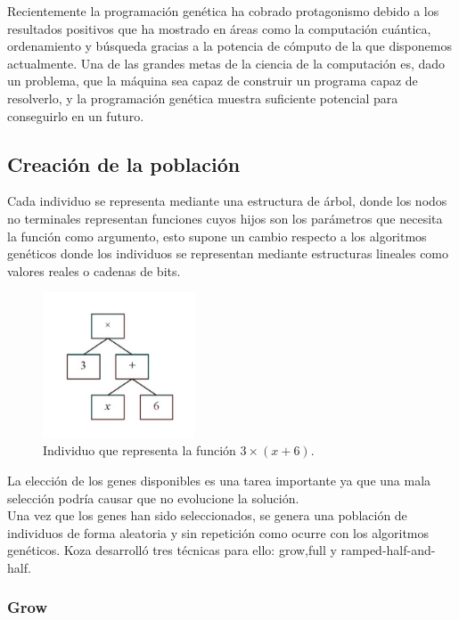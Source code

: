 \documentclass[12pt]{article} \usepackage[utf8]{inputenc}
\begin{document}
Recientemente la programación genética ha cobrado protagonismo debido
a los resultados positivos que ha mostrado en áreas como la computación
cuántica, ordenamiento y búsqueda gracias a la potencia de cómputo de
la que disponemos actualmente. Una de las grandes metas de la ciencia
de la computación es, dado un problema, que la máquina sea capaz de
construir un programa capaz de resolverlo, y la programación genética
muestra suficiente potencial para conseguirlo en un futuro.\\


\subsection {Creación de la población}

Cada individuo se representa mediante una estructura de árbol, donde
los nodos no terminales representan funciones cuyos hijos son los
parámetros que necesita la función como argumento, esto supone un
cambio respecto a los algoritmos genéticos donde los individuos se
representan mediante estructuras lineales como valores reales o
cadenas de bits.

\begin{figure}[H]
  \centering
  \includegraphics[width=0.4\textwidth]{individuo.PNG}
  \caption{Individuo que representa la función \(3\times(x+6)\).}
  \label{fig:dfd:1}
\end{figure}


La elección de los genes disponibles es una tarea importante
ya que una mala selección podría causar que no evolucione
la solución.\\

Una vez que los genes han sido seleccionados, se genera una
población de individuos de forma aleatoria y sin repetición
como ocurre con los algoritmos genéticos. Koza desarrolló
tres técnicas para ello: grow,full y ramped-half-and-half.


\subsubsection{Grow}
\end{document}
